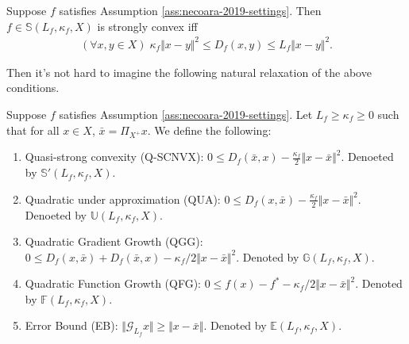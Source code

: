 \documentclass[12pt]{report}
\begin{document}
            \begin{definition}\label{def:necoara-scnvx}
                Suppose $f$ satisfies Assumption \ref{ass:necoara-2019-settings}. 
                Then $f \in \mathbb S(L_f, \kappa_f, X)$ is strongly convex iff 
                \begin{align*}
                    (\forall x, y\in X)\; 
                    \kappa_f \Vert x - y\Vert^2 \le 
                    D_f(x, y) \le L_f \Vert x - y\Vert^2. 
                \end{align*}
            \end{definition}
            Then it's not hard to imagine the following natural relaxation of the above conditions. 
            \begin{definition}\label{def:necoara-weaker-scnvx}
                Suppose $f$ satisfies Assumption \ref{ass:necoara-2019-settings}. 
                Let $L_f \ge \kappa_f \ge 0$ such that for all $x \in X$, $\bar x = \Pi_{X^+} x$. 
                We define the following: 
                \begin{enumerate}
                    \item\label{def:neocara-qscnvx} Quasi-strong convexity (Q-SCNVX): $0 \le D_f(\bar x, x) - \frac{\kappa_f}{2}\Vert x - \bar x\Vert^2$. Denoeted by $\mathbb S'(L_f, \kappa_f, X)$. 
                    \item\label{def:necoara-qup} Quadratic under approximation (QUA): $0 \le D_f(x, \bar x) - \frac{\kappa_f}{2}\Vert x - \bar x\Vert^2$. Denoeted by $\mathbb U(L_f, \kappa_f, X)$. 
                    \item\label{def:necoara-qgg} Quadratic Gradient Growth (QGG): $0\le D_f(x, \bar x) + D_f(\bar x, x) - \kappa_f/2\Vert x - \bar x\Vert^2$. Denoted by $\mathbb G(L_f, \kappa_f, X)$. 
                    \item\label{def:necoara-qfg} Quadratic Function Growth (QFG): $0 \le f(x) - f^* - \kappa_f/2\Vert x - \bar x\Vert^2$. Denoted by $\mathbb F(L_f, \kappa_f, X)$. 
                    \item\label{def:necoara-eb} Error Bound (EB): $\Vert \mathcal G_{L_f}x\Vert \ge \Vert x - \bar x\Vert$. Denoted by $\mathbb E(L_f, \kappa_f, X)$. 
                \end{enumerate}
            \end{definition}
\end{document}
